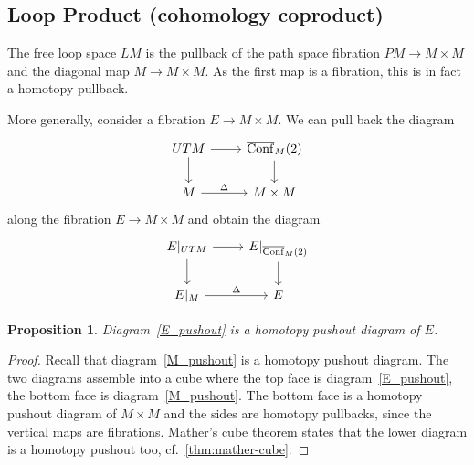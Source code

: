 \documentclass{scrartcl}
\theoremstyle{plain}
\newtheorem{proposition}[theorem]{Proposition}
\theoremstyle{definition}
\DeclareMathOperator{\cConf}{\overline{Conf}}
\begin{document}
\subsection{Loop Product (cohomology coproduct)}\label{subsec:loop-product}
The free loop space $LM$ is the pullback of the path space fibration $PM \to M\times M$ and the diagonal map $M\to M\times M$. As the first map is a fibration, this is in fact a homotopy pullback. %

More generally, consider a fibration $E\to M\times M$. We can pull back the diagram 
\begin{equation}\label{M_pushout}
    \begin{tikzcd}
        UTM \dar\rar & \cConf_M(2)\dar \\
        M \rar["\Delta"] & M\times M
    \end{tikzcd}
\end{equation}
along the fibration $E\to M\times M$ and obtain the diagram
\begin{equation}\label{E_pushout}
    \begin{tikzcd}
        E|_{UTM} \dar\rar & E|_{\cConf_M(2)}\dar \\
        E|_M \rar["\Delta"] & E
    \end{tikzcd}
\end{equation}
\begin{proposition}\label{lem:pullback_cube}
    Diagram~\ref{E_pushout} is a homotopy pushout diagram of $E$. 
\end{proposition}
\begin{proof}
Recall that diagram~\ref{M_pushout} is a homotopy pushout diagram. The two diagrams assemble into a cube where the top face is diagram~\ref{E_pushout}, the bottom face is diagram~\ref{M_pushout}. The bottom face is a homotopy pushout diagram of $M\times M$ and the sides are homotopy pullbacks, since the vertical maps are fibrations. Mather's cube theorem states that the lower diagram is a homotopy pushout too, cf.\ \cref{thm:mather-cube}. 
\end{proof}
\end{document}
